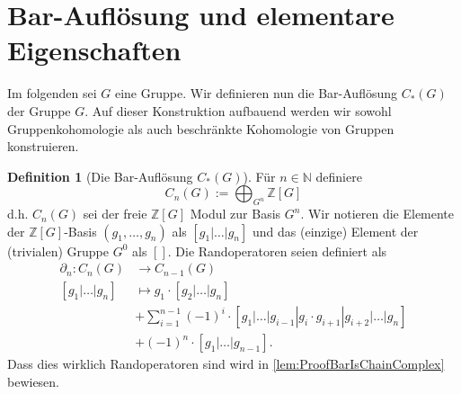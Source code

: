 \documentclass[a4paper,twoside,10pt]{scrreprt}
\newcommand{\Z}{\mathbb{Z}}
\newcommand{\N}{\mathbb{N}}
\theoremstyle{definition}
\newtheorem{definition}[satz]{Definition}
\begin{document}
\section{Bar-Auflösung und elementare Eigenschaften}
Im folgenden sei $G$ eine Gruppe.
Wir definieren nun die Bar-Auflösung $C_*(G)$ der Gruppe $G$. Auf dieser Konstruktion aufbauend werden wir sowohl Gruppenkohomologie als auch beschränkte Kohomologie von Gruppen konstruieren.
\begin{definition}[Die Bar-Auflösung $C_*(G)$]\label{def:BarRes}
Für $n\in \N$ definiere
\begin{equation*}
C_n(G):=\bigoplus_{G^n} \Z[G]
\end{equation*}
d.h. $C_n(G)$ sei der freie $\Z[G]$ Modul zur Basis $G^n$. Wir notieren die Elemente der $\Z[G]$-Basis $(g_1,\ldots,g_n)$ als $[g_1|\ldots|g_n]$ und das (einzige) Element der (trivialen) Gruppe $G^0$ als $[]$.
Die Randoperatoren seien definiert als
\begin{align*}
\partial_n:C_n(G)&\to C_{n-1}(G)\\
[g_1|\ldots|g_n]&\mapsto g_1\cdot [g_2|\ldots|g_n]\\ 
&+\sum\limits_{i=1}^{n-1} (-1)^i\cdot [g_1|\ldots|g_{i-1}|g_i\cdot g_{i+1}|g_{i+2}|\ldots|g_n]\\
&+(-1)^n\cdot [g_1|\ldots|g_{n-1}].
\end{align*}
Dass dies wirklich Randoperatoren sind wird in \cref{lem:ProofBarIsChainComplex} bewiesen.
\end{definition}
\end{document}
